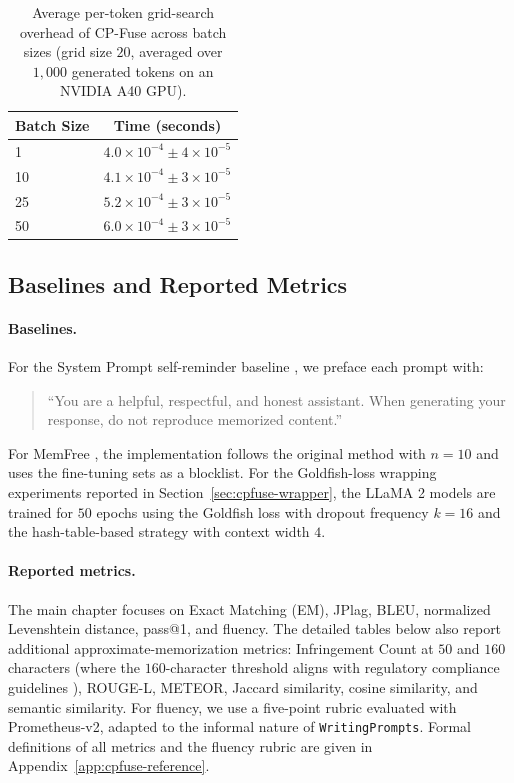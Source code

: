 \begin{table}[!tbp]
\centering
\caption{Average per-token grid-search overhead of CP-Fuse across batch sizes (grid size \(20\), averaged over \(1{,}000\) generated tokens on an NVIDIA A40 GPU).}
\label{tab:app-cpfuse-grid-overhead}
\begin{tabular}{lc}
\toprule
\textbf{Batch Size} & \textbf{Time (seconds)} \\
\midrule
1  & \(4.0 \times 10^{-4} \pm 4 \times 10^{-5}\) \\
10 & \(4.1 \times 10^{-4} \pm 3 \times 10^{-5}\) \\
25 & \(5.2 \times 10^{-4} \pm 3 \times 10^{-5}\) \\
50 & \(6.0 \times 10^{-4} \pm 3 \times 10^{-5}\) \\
\bottomrule
\end{tabular}
\end{table}

\subsection{Baselines and Reported Metrics}

\paragraph{Baselines.}
For the System Prompt self-reminder baseline \citep{xie2023defending}, we preface each prompt with:
\begin{quote}
    ``You are a helpful, respectful, and honest assistant. When generating your response, do not reproduce memorized content.''
\end{quote}
For MemFree \citep{ippolito2023preventing}, the implementation follows the original method with \(n=10\) and uses the fine-tuning sets as a blocklist. For the Goldfish-loss wrapping experiments reported in Section~\ref{sec:cpfuse-wrapper}, the LLaMA 2 models are trained for \(50\) epochs using the Goldfish loss \citep{hans2024like} with dropout frequency \(k=16\) and the hash-table-based strategy with context width \(4\).

\paragraph{Reported metrics.}
The main chapter focuses on Exact Matching (EM), JPlag, BLEU, normalized Levenshtein distance, pass@1, and fluency. The detailed tables below also report additional approximate-memorization metrics: Infringement Count at \(50\) and \(160\) characters (where the \(160\)-character threshold aligns with regulatory compliance guidelines \citep{mueller2024llms}), ROUGE-L, METEOR, Jaccard similarity, cosine similarity, and semantic similarity. For fluency, we use a five-point rubric evaluated with Prometheus-v2, adapted to the informal nature of \texttt{WritingPrompts}. Formal definitions of all metrics and the fluency rubric are given in Appendix~\ref{app:cpfuse-reference}.

